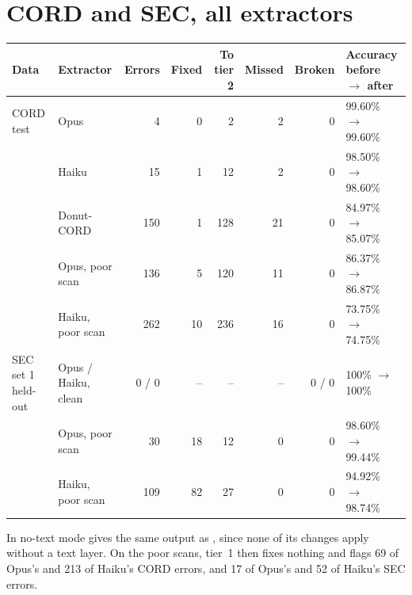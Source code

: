 \section{CORD and SEC, all extractors}\label{app:realdata}
\begin{center}
\begin{tabular}{llrrrrrl}
\toprule
Data & Extractor & Errors & Fixed & To tier 2 & Missed & Broken & Accuracy before $\rightarrow$ after \\
\midrule
CORD test & Opus & 4 & 0 & 2 & 2 & 0 & 99.60\% $\rightarrow$ 99.60\% \\
 & Haiku & 15 & 1 & 12 & 2 & 0 & 98.50\% $\rightarrow$ 98.60\% \\
 & Donut-CORD & 150 & 1 & 128 & 21 & 0 & 84.97\% $\rightarrow$ 85.07\% \\
 & Opus, poor scan & 136 & 5 & 120 & 11 & 0 & 86.37\% $\rightarrow$ 86.87\% \\
 & Haiku, poor scan & 262 & 10 & 236 & 16 & 0 & 73.75\% $\rightarrow$ 74.75\% \\
\midrule
SEC set 1 held-out & Opus / Haiku, clean & 0 / 0 & -- & -- & -- & 0 / 0 & 100\% $\rightarrow$ 100\% \\
 & Opus, poor scan & 30 & 18 & 12 & 0 & 0 & 98.60\% $\rightarrow$ 99.44\% \\
 & Haiku, poor scan & 109 & 82 & 27 & 0 & 0 & 94.92\% $\rightarrow$ 98.74\% \\
\bottomrule
\end{tabular}
\end{center}
In no-text mode  gives the same output as , since none of its changes apply without a text layer. On the poor scans, tier~1 then fixes nothing and flags 69 of Opus's and 213 of Haiku's CORD errors, and 17 of Opus's and 52 of Haiku's SEC errors.

